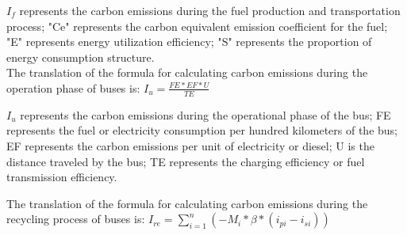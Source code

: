\documentclass{apmcmthesis}
\begin{document}
$I_f$ represents the carbon emissions during the fuel production and transportation process; "Ce" represents the carbon equivalent emission coefficient for the fuel; "E" represents energy utilization efficiency; "S" represents the proportion of energy consumption structure. \\

The translation of the formula for calculating carbon emissions during the operation phase of buses \cite{unep2019emissions} is:
$I_u = \frac{FE*EF*U}{TE}$

$I_u$ represents the carbon emissions during the operational phase of the bus; FE represents the fuel or electricity consumption per hundred kilometers of the bus; EF represents the carbon emissions per unit of electricity or diesel; U is the distance traveled by the bus; TE represents the charging efficiency or fuel transmission efficiency.


The translation of the formula for calculating carbon emissions during the recycling process of buses \cite{47} is:
$I_{re} = \sum_{i=1}^{n}(-M_i*\beta * (i_{pi}-i_{si}))$
\end{document}
